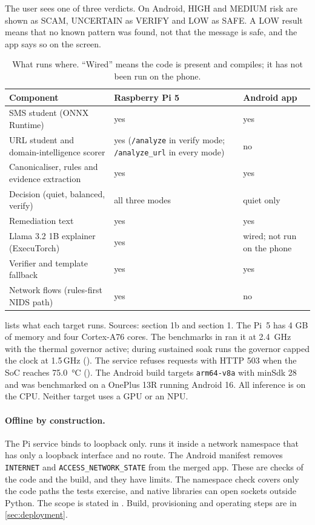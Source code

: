 The user sees one of three verdicts. On Android, HIGH and MEDIUM risk are shown as SCAM, UNCERTAIN as VERIFY and LOW as SAFE. A LOW result means that no known pattern was found, not that the message is safe, and the app says so on the screen.

\begin{table}[t]
\centering
\caption{What runs where. ``Wired'' means the code is present and compiles; it has not been run on the phone.}
\label{tab:targets}
\small
\begin{tabularx}{\linewidth}{Y Y Y}
\toprule
Component & Raspberry Pi 5 & Android app \\
\midrule
SMS student (ONNX Runtime) & yes & yes \\
URL student and domain-intelligence scorer & yes (\texttt{/analyze} in verify mode; \texttt{/analyze\_url} in every mode) & no \\
Canonicaliser, rules and evidence extraction & yes & yes \\
Decision (quiet, balanced, verify) & all three modes & quiet only \\
Remediation text & yes & yes \\
Llama 3.2 1B explainer (ExecuTorch) & yes & wired; not run on the phone \\
Verifier and template fallback & yes & yes \\
Network flows (rules-first NIDS path) & yes & no \\
\bottomrule
\end{tabularx}
\end{table}

 lists what each target runs. Sources:  section 1b and  section 1. The Pi~5 has 4 GB of memory and four Cortex-A76 cores. The benchmarks in  ran it at \SI{2.4}{\giga\hertz} with the thermal governor active; during sustained soak runs the governor capped the clock at 1.5\,GHz (). The service refuses requests with HTTP 503 when the SoC reaches \SI{75.0}{\celsius} (). The Android build targets \texttt{arm64-v8a} with minSdk 28 and was benchmarked on a OnePlus 13R running Android 16. All inference is on the CPU. Neither target uses a GPU or an NPU.

\paragraph{Offline by construction.} The Pi service binds to loopback only.  runs it inside a network namespace that has only a loopback interface and no route. The Android manifest removes \texttt{INTERNET} and \texttt{ACCESS\_NETWORK\_STATE} from the merged app. These are checks of the code and the build, and they have limits. The namespace check covers only the code paths the tests exercise, and native libraries can open sockets outside Python. The scope is stated in . Build, provisioning and operating steps are in \cref{sec:deployment}.
